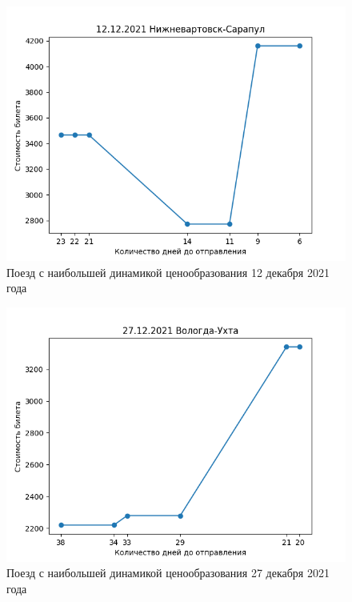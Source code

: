 \documentclass[conference]{IEEEtran}
\begin{document}
\begin{figure}
	\includegraphics[scale=0.5]{12122021}
	\caption{Поезд с наибольшей динамикой ценообразования 12 декабря 2021 года}
\end{figure}

\begin{figure}
	\includegraphics[scale=0.5]{27122021}
	\caption{Поезд с наибольшей динамикой ценообразования 27 декабря 2021 года}
\end{figure}
\end{document}
